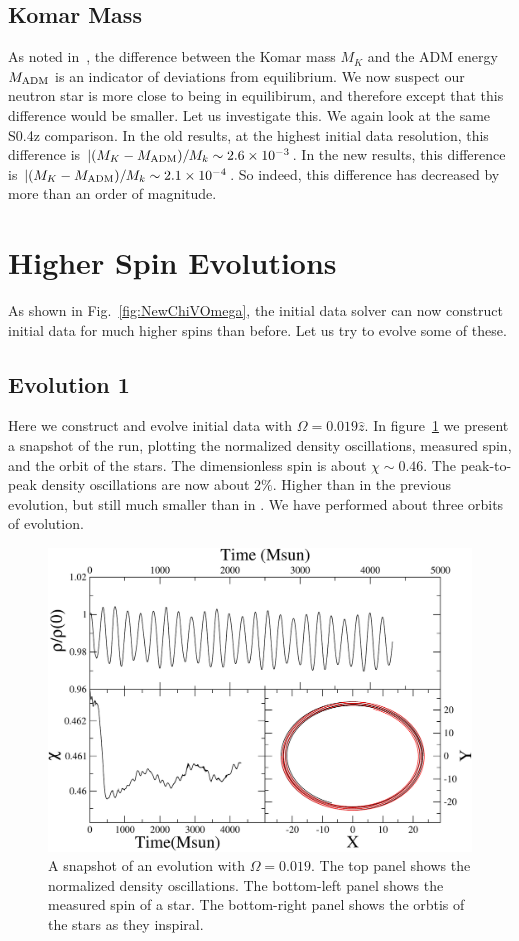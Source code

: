 \subsection{Komar Mass}
As noted in~\cite{FoucartEtAl:2008}, the difference between the Komar mass $M_K$ and the
ADM energy $M_{\rm ADM}$ is an indicator of deviations from
equilibrium. We now suspect our neutron star is more close to being in
equilibirum, and therefore except that this difference would be
smaller. Let us investigate this. We again look at the same S0.4z
comparison. In the old results, at the highest initial data
resolution, this difference is $|(M_K-M_{\rm ADM})/M_k \sim 2.6 \times
10^{-3}$. In the new results, this difference is 
$|(M_K-M_{\rm ADM})/M_k \sim 2.1 \times
10^{-4}$. So indeed, this difference has decreased by more than an
order of magnitude.

\section{Higher Spin Evolutions}
As shown in Fig.~\ref{fig:NewChiVOmega}, the initial data solver can
now construct initial data for much higher spins than before. Let us
try to evolve some of these.

\subsection{Evolution 1}
Here we construct and evolve initial data with $\Omega=0.019\hat{z}$. In
figure~\ref{fig:Ev1Snapshot} we present a snapshot of the run,
plotting the normalized density oscillations, measured spin, and the
orbit of the stars. The dimensionless spin is about $\chi \sim
0.46$. The peak-to-peak density oscillations are now about
$2\%$. Higher than in the previous evolution, but still much smaller
than in \cite{Tacik:2015tja}. We have performed about three orbits of evolution.

\begin{figure}[!ht]
\includegraphics[width=0.95\columnwidth]{chap6/Ev1Snapshot}
\caption{\label{fig:Ev1Snapshot} A snapshot of an evolution with
  $\Omega=0.019$. The top panel shows the normalized density
  oscillations. The bottom-left panel shows the measured spin of a
  star. The bottom-right panel shows the orbtis of the stars as they
  inspiral.}
\end{figure}

